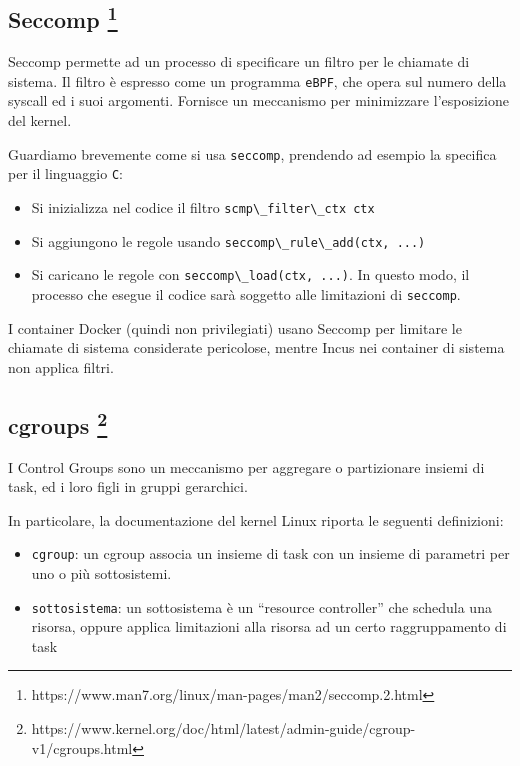 \subsection[Seccomp ]{\texorpdfstring{Seccomp
\footnote{\label{fn:ref_33}https://www.man7.org/linux/man-pages/man2/seccomp.2.html}}{Seccomp }}\label{seccomp-4}

Seccomp permette ad un processo di specificare un filtro per le chiamate
di sistema. Il filtro è espresso come un programma
\passthrough{\lstinline!eBPF!}, che opera sul numero della syscall ed i
suoi argomenti. Fornisce un meccanismo per minimizzare l'esposizione del
kernel.

Guardiamo brevemente come si usa \passthrough{\lstinline!seccomp!},
prendendo ad esempio la specifica per il linguaggio
\passthrough{\lstinline!C!}:

\begin{itemize}
\tightlist
\item
  Si inizializza nel codice il filtro
  \passthrough{\lstinline!scmp\_filter\_ctx ctx!}
\item
  Si aggiungono le regole usando
  \passthrough{\lstinline!seccomp\_rule\_add(ctx, ...)!}
\item
  Si caricano le regole con
  \passthrough{\lstinline!seccomp\_load(ctx, ...)!}. In questo modo, il
  processo che esegue il codice sarà soggetto alle limitazioni di
  \passthrough{\lstinline!seccomp!}.
\end{itemize}

I container Docker (quindi non privilegiati) usano Seccomp per limitare
le chiamate di sistema considerate pericolose, mentre Incus nei
container di sistema non applica filtri.

\subsection[cgroups ]{\texorpdfstring{cgroups
\footnote{\label{fn:ref_34}https://www.kernel.org/doc/html/latest/admin-guide/cgroup-v1/cgroups.html}}{cgroups }}\label{cgroups-5}

I Control Groups sono un meccanismo per aggregare o partizionare insiemi
di task, ed i loro figli in gruppi gerarchici.

In particolare, la documentazione del kernel Linux riporta le seguenti
definizioni:

\begin{itemize}
\tightlist
\item
  \passthrough{\lstinline!cgroup!}: un cgroup associa un insieme di task
  con un insieme di parametri per uno o più sottosistemi.
\item
  \passthrough{\lstinline!sottosistema!}: un sottosistema è un
  ``resource controller'' che schedula una risorsa, oppure applica
  limitazioni alla risorsa ad un certo raggruppamento di task
\end{itemize}

